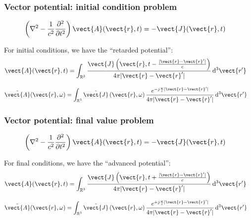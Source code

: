\documentclass[12 pt, compress, handout, intlimits]{beamer}
\renewcommand{\d}{\operatorname{d}\!}
\newcommand{\ft}[1]{\tilde{#1}}
\begin{document}
\begin{frame}[fragile]
    \frametitle{Vector potential: initial condition problem}
    
    \begin{align*}
        \left( \nabla^2 - \frac{1}{c^2} \frac{\partial^2}{\partial t^2} \right) \vect{A}(\vect{r}, t) &= - \vect{J}(\vect{r}, t)
    \end{align*}
    
    For initial conditions, we have the ``retarded potential'':
    \begin{align*}
        \vect{A}(\vect{r}, t) &= \int_{\mathbb{R}^3} \frac{\vect{J}\left(\vect{r}, t - \frac{|\vect{r} - \vect{r}'|}{c}\right)}{4 \pi |\vect{r} - \vect{r}'|} \d^3 \vect{r'}
    \end{align*}

    \begin{align*}
        \ft{\vect{A}}(\vect{r}, \omega) &= \int_{\mathbb{R}^3} \ft{\vect{J}}\left(\vect{r}, \omega \right) \frac{e^{- j \frac{\omega}{c} | \vect{r} - \vect{r}' |}}{4 \pi |\vect{r} - \vect{r}'|} \d^3 \vect{r'}
    \end{align*}
    
    
\end{frame}


\begin{frame}[fragile]
    \frametitle{Vector potential: final value problem}
    
    \begin{align*}
        \left( \nabla^2 - \frac{1}{c^2} \frac{\partial^2}{\partial t^2} \right) \vect{A}(\vect{r}, t) &= - \vect{J}(\vect{r}, t)
    \end{align*}
    
    For final conditions, we have the ``advanced potential'':
    \begin{align*}
        \vect{A}(\vect{r}, t) &= \int_{\mathbb{R}^3} \frac{\vect{J}\left(\vect{r}, t + \frac{|\vect{r} - \vect{r}'|}{c}\right)}{4 \pi |\vect{r} - \vect{r}'|} \d^3 \vect{r'}
    \end{align*}
 
    \begin{align*}
        \ft{\vect{A}}(\vect{r}, \omega) &= \int_{\mathbb{R}^3} \ft{\vect{J}}\left(\vect{r}, \omega \right) \frac{e^{+ j \frac{\omega}{c} | \vect{r} - \vect{r}' |}}{4 \pi |\vect{r} - \vect{r}'|} \d^3 \vect{r'}
    \end{align*}
       
\end{frame}
\end{document}
